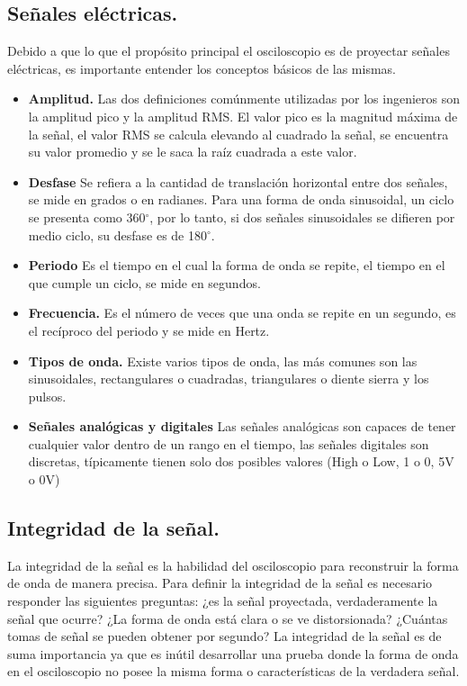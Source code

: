 \documentclass[12pt,letterpaper]{report}
\begin{document}
\subsection{Señales eléctricas.} Debido a que lo que el propósito principal el osciloscopio es de proyectar señales eléctricas, es importante entender los conceptos básicos de las mismas.
\begin{itemize}
\item \textbf{Amplitud.} Las dos definiciones comúnmente utilizadas por los ingenieros son la amplitud pico y la amplitud RMS. El valor pico es la magnitud máxima de la señal, el valor RMS se calcula elevando al cuadrado la señal, se encuentra su valor promedio y se le saca la raíz cuadrada a este valor.
\item \textbf{Desfase} Se refiera a la cantidad de translación horizontal entre dos señales, se mide en grados o en radianes. Para una forma de onda sinusoidal, un ciclo se presenta como 360$^{\circ}$, por lo tanto, si dos señales sinusoidales se difieren por medio ciclo, su desfase es de 180$^{\circ}$.
\item \textbf{Periodo} Es el tiempo en el cual la forma de onda se repite, el tiempo en el que cumple un ciclo, se mide en segundos.
\item \textbf{Frecuencia.} Es el número de veces que una onda se repite en un segundo, es el recíproco del periodo y se mide en Hertz.
\item \textbf{Tipos de onda.} Existe varios tipos de onda, las más comunes son las sinusoidales, rectangulares o cuadradas, triangulares o diente sierra y los pulsos.
\item\textbf{Señales analógicas y digitales} Las señales analógicas son capaces de tener cualquier valor dentro de un rango en el tiempo, las señales digitales son discretas, típicamente tienen solo dos posibles valores (High o Low, 1 o 0, 5V o 0V)
\end{itemize}
\subsection{Integridad de la señal.} La integridad de la señal es la habilidad del osciloscopio para reconstruir la forma de onda de manera precisa. Para definir la integridad de la señal es necesario responder las siguientes preguntas: ¿es la señal proyectada, verdaderamente la señal que ocurre? ¿La forma de onda está clara o se ve distorsionada? ¿Cuántas tomas de señal se pueden obtener por segundo? La integridad de la señal es de suma importancia ya que es inútil desarrollar una prueba donde la forma de onda en el osciloscopio no posee la misma forma o características de la verdadera señal.
\end{document}

